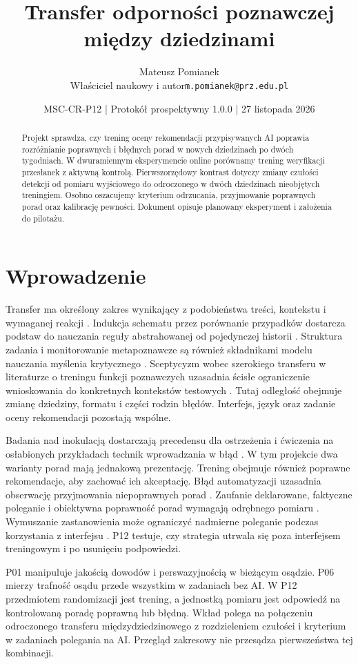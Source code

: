 \documentclass[11pt,a4paper]{article}
\title{Transfer odporności poznawczej między dziedzinami}
\author{Mateusz Pomianek\\\small Właściciel naukowy i autor\quad\texttt{m.pomianek@prz.edu.pl}}
\date{MSC-CR-P12 | Protokół prospektywny 1.0.0 | 27 listopada 2026}
\begin{document}
\maketitle
\begin{abstract}
Projekt sprawdza, czy trening oceny rekomendacji przypisywanych AI poprawia rozróżnianie poprawnych i błędnych porad w nowych dziedzinach po dwóch tygodniach. W dwuramiennym eksperymencie online porównamy trening weryfikacji przesłanek z aktywną kontrolą. Pierwszorzędowy kontrast dotyczy zmiany czułości detekcji od pomiaru wyjściowego do odroczonego w dwóch dziedzinach nieobjętych treningiem. Osobno oszacujemy kryterium odrzucania, przyjmowanie poprawnych porad oraz kalibrację pewności. Dokument opisuje planowany eksperyment i założenia do pilotażu.
\end{abstract}

\section{Wprowadzenie}
Transfer ma określony zakres wynikający z podobieństwa treści, kontekstu i wymaganej reakcji \citep{barnett2002}. Indukcja schematu przez porównanie przypadków dostarcza podstaw do nauczania reguły abstrahowanej od pojedynczej historii \citep{gick1983}. Struktura zadania i monitorowanie metapoznawcze są również składnikami modelu nauczania myślenia krytycznego \citep{halpern1998}. Sceptycyzm wobec szerokiego transferu w literaturze o treningu funkcji poznawczych uzasadnia ścisłe ograniczenie wnioskowania do konkretnych kontekstów testowych \citep{sala2019}. Tutaj odległość obejmuje zmianę dziedziny, formatu i części rodzin błędów. Interfejs, język oraz zadanie oceny rekomendacji pozostają wspólne.

Badania nad inokulacją dostarczają precedensu dla ostrzeżenia i ćwiczenia na osłabionych przykładach technik wprowadzania w błąd \citep{roozenbeek2022}. W tym projekcie dwa warianty porad mają jednakową prezentację. Trening obejmuje również poprawne rekomendacje, aby zachować ich akceptację. Błąd automatyzacji uzasadnia obserwację przyjmowania niepoprawnych porad \citep{skitka1999}. Zaufanie deklarowane, faktyczne poleganie i obiektywna poprawność porad wymagają odrębnego pomiaru \citep{lee2004,schemmer2023}. Wymuszanie zastanowienia może ograniczyć nadmierne poleganie podczas korzystania z interfejsu \citep{bucinca2021}. P12 testuje, czy strategia utrwala się poza interfejsem treningowym i po usunięciu podpowiedzi.

P01 manipuluje jakością dowodów i perswazyjnością w bieżącym osądzie. P06 mierzy trafność osądu przede wszystkim w zadaniach bez AI. W P12 przedmiotem randomizacji jest trening, a jednostką pomiaru jest odpowiedź na kontrolowaną poradę poprawną lub błędną. Wkład polega na połączeniu odroczonego transferu międzydziedzinowego z rozdzieleniem czułości i kryterium w zadaniach polegania na AI. Przegląd zakresowy nie przesądza pierwszeństwa tej kombinacji.
\end{document}
